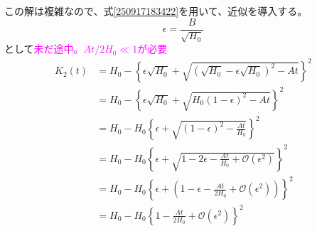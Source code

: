 \documentclass[]{article}
\begin{document}
この解は複雑なので、式\eqref{250917183422}を用いて、近似を導入する。
\begin{equation} \label{250918054610} 
   \epsilon =  \frac{B}{\sqrt{H_0}}
\end{equation}
として\textcolor{magenta}{未だ途中。$At/2H_0 \ll 1$が必要}
\begin{align}
   K_2(t) &= H_0 - \left\{
   				\epsilon \sqrt{H_0} + \sqrt{(\sqrt{H_0}-\epsilon \sqrt{H_0})^2-At}
   				\right\}^2   \label{250918054717a} \\
   &= H_0 - \left\{
   				\epsilon \sqrt{H_0} + \sqrt{H_0(1-\epsilon )^2-At}
   				\right\}^2   \label{250918054717b} \\
   &=   H_0 - H_0\left\{
   				\epsilon  + \sqrt{(1-\epsilon )^2-\frac{At}{H_0}}
   				\right\}^2  \label{250918054717c} \\
   &=    H_0 - H_0\left\{
   				\epsilon  + \sqrt{1-2\epsilon-\frac{At}{H_0}+\mathcal{O}(\epsilon^2)}
   				\right\}^2  \label{250918054717d} \\
   &=   H_0 - H_0\left\{
   				\epsilon  + \left(1-\epsilon-\frac{At}{2H_0}+\mathcal{O}(\epsilon^2)\right)
   				\right\}^2 \label{250918054717e} \\
   &=  H_0 - H_0\left\{
   				 1-\frac{At}{2H_0}+\mathcal{O}(\epsilon^2)
   				\right\}^2 \label{250918054717f} 
\end{align}
\end{document}
